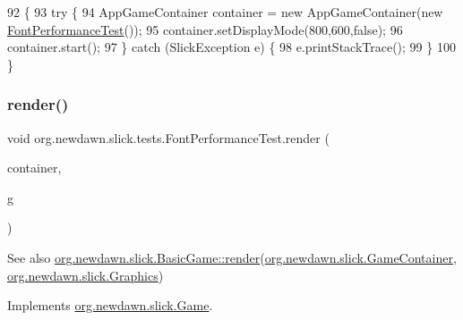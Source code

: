 \begin{DoxyCode}
92                                            \{
93         \textcolor{keywordflow}{try} \{
94             AppGameContainer container = \textcolor{keyword}{new} AppGameContainer(\textcolor{keyword}{new} 
      \mbox{\hyperlink{classorg_1_1newdawn_1_1slick_1_1tests_1_1_font_performance_test_aba85d0da47806a79a5e11159d80d0382}{FontPerformanceTest}}());
95             container.setDisplayMode(800,600,\textcolor{keyword}{false});
96             container.start();
97         \} \textcolor{keywordflow}{catch} (SlickException e) \{
98             e.printStackTrace();
99         \}
100     \}
\end{DoxyCode}
\mbox{\label{classorg_1_1newdawn_1_1slick_1_1tests_1_1_font_performance_test_a7014f0e38f13f774eee098cd46187b5f}} 
\subsubsection{\texorpdfstring{render()}{render()}}
{\footnotesize\ttfamily void org.\+newdawn.\+slick.\+tests.\+Font\+Performance\+Test.\+render (\begin{DoxyParamCaption}\item[{\mbox{\hyperlink{classorg_1_1newdawn_1_1slick_1_1_game_container}{Game\+Container}}}]{container,  }\item[{\mbox{\hyperlink{classorg_1_1newdawn_1_1slick_1_1_graphics}{Graphics}}}]{g }\end{DoxyParamCaption})\hspace{0.3cm}{\ttfamily [inline]}}

\begin{DoxySeeAlso}{See also}
\mbox{\hyperlink{interfaceorg_1_1newdawn_1_1slick_1_1_game_af1a4670d43eb3ba04dfcf55ab1975b64}{org.\+newdawn.\+slick.\+Basic\+Game\+::render}}(\mbox{\hyperlink{classorg_1_1newdawn_1_1slick_1_1_game_container}{org.\+newdawn.\+slick.\+Game\+Container}}, \mbox{\hyperlink{classorg_1_1newdawn_1_1slick_1_1_graphics}{org.\+newdawn.\+slick.\+Graphics}}) 
\end{DoxySeeAlso}


Implements \mbox{\hyperlink{interfaceorg_1_1newdawn_1_1slick_1_1_game_af1a4670d43eb3ba04dfcf55ab1975b64}{org.\+newdawn.\+slick.\+Game}}.


